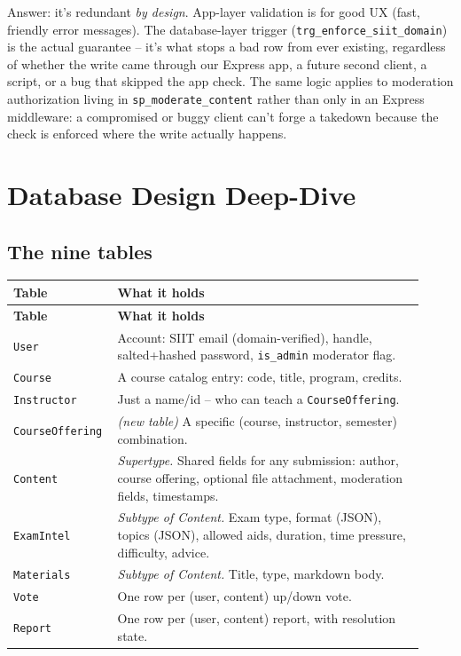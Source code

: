 \documentclass[11pt]{article}
\begin{document}
Answer: it's redundant \emph{by design}. App-layer validation is for good UX (fast, friendly error messages). The database-layer trigger (\texttt{trg\_enforce\_siit\_domain}) is the actual guarantee -- it's what stops a bad row from ever existing, regardless of whether the write came through our Express app, a future second client, a script, or a bug that skipped the app check. The same logic applies to moderation authorization living in \texttt{sp\_moderate\_content} rather than only in an Express middleware: a compromised or buggy client can't forge a takedown because the check is enforced where the write actually happens.

\section{Database Design Deep-Dive}

\subsection{The nine tables}
\begin{longtable}{@{}p{0.20\linewidth} p{0.72\linewidth}@{}}
\toprule
\textbf{Table} & \textbf{What it holds} \\
\midrule
\endfirsthead
\toprule
\textbf{Table} & \textbf{What it holds} \\
\midrule
\endhead
\bottomrule
\endfoot
\texttt{User} & Account: SIIT email (domain-verified), handle, salted+hashed password, \texttt{is\_admin} moderator flag. \\[4pt]
\texttt{Course} & A course catalog entry: code, title, program, credits. \\[4pt]
\texttt{Instructor} & Just a name/id -- who can teach a \texttt{CourseOffering}. \\[4pt]
\texttt{CourseOffering} & \emph{(new table)} A specific (course, instructor, semester) combination. \\[4pt]
\texttt{Content} & \emph{Supertype.} Shared fields for any submission: author, course offering, optional file attachment, moderation fields, timestamps. \\[4pt]
\texttt{ExamIntel} & \emph{Subtype of Content.} Exam type, format (JSON), topics (JSON), allowed aids, duration, time pressure, difficulty, advice. \\[4pt]
\texttt{Materials} & \emph{Subtype of Content.} Title, type, markdown body. \\[4pt]
\texttt{Vote} & One row per (user, content) up/down vote. \\[4pt]
\texttt{Report} & One row per (user, content) report, with resolution state. \\
\end{longtable}
\end{document}
